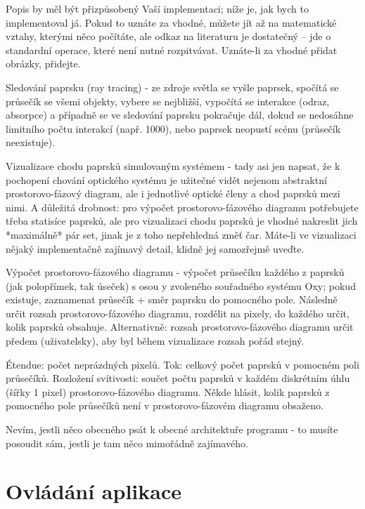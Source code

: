 Popis by měl být přizpůsobený Vaší implementaci; níže je, jak bych to
implementoval já. Pokud to uznáte za vhodné, můžete jít až na
matematické vztahy, kterými něco počítáte, ale odkaz na literaturu je
dostatečný -- jde o standardní operace, které není nutné rozpitvávat.
Uznáte-li za vhodné přidat obrázky, přidejte.

Sledování paprsku (ray tracing) - ze zdroje světla se vyšle paprsek,
spočítá se průsečík se všemi objekty, vybere se nejbližší, vypočítá se
interakce (odraz, absorpce) a případně se ve sledování paprsku pokračuje
dál, dokud se nedosáhne limitního počtu interakcí (např. 1000), nebo
paprsek neopustí scénu (průsečík neexistuje).

Vizualizace chodu paprsků simulovaným systémem - tady asi jen napsat, že
k pochopení chování optického systému je užitečné vidět nejenom
abstraktní prostorovo-fázový diagram, ale i jednotlivé optické členy a
chod paprsků mezi nimi. A důležitá drobnost: pro výpočet
prostorovo-fázového diagramu potřebujete třeba statisíce paprsků, ale
pro vizualizaci chodu paprsků je vhodné nakreslit jich *maximálně* pár
set, jinak je z toho nepřehledná změť čar. Máte-li ve vizualizaci nějaký
implementačně zajímavý detail, klidně jej samozřejmě uveďte.

Výpočet prostorovo-fázového diagramu - výpočet průsečíku každého z
paprsků (jak polopřímek, tak úseček) s osou y zvoleného souřadného
systému Oxy; pokud existuje, zaznamenat průsečík + směr paprsku do
pomocného pole. Následně určit rozsah prostorovo-fázového diagramu,
rozdělit na pixely, do každého určit, kolik paprsků obsahuje.
Alternativně: rozsah prostorovo-fázového diagramu určit předem
(uživatelsky), aby byl během vizualizace rozsah pořád stejný.

Étendue: počet neprázdných pixelů. Tok: celkový počet paprsků v pomocném
poli průsečíků. Rozložení svítivosti: součet počtu paprsků v každém
diskrétním úhlu (šířky 1 pixel) prostorovo-fázového diagramu. Někde
hlásit, kolik paprsků z pomocného pole průsečíků není v
prostorovo-fázovém diagramu obsaženo.

Nevím, jestli něco obecného psát k obecné architektuře programu - to
musíte posoudit sám, jestli je tam něco mimořádně zajímavého.



%
%



\section{Ovládání aplikace}






